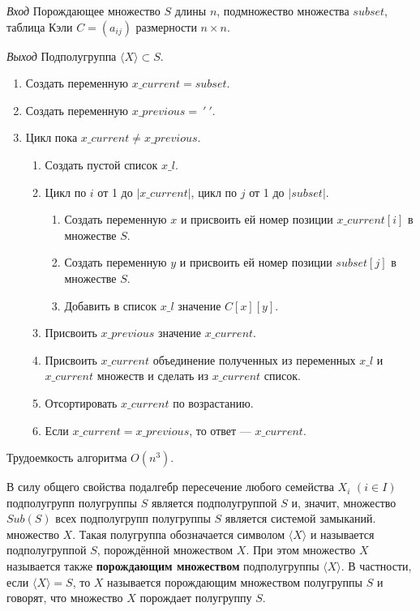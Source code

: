 \documentclass[bachelor, och, labwork]{shiza}
\begin{document}
\textit{Вход} Порождающее множество $S$ длины $n$, подмножество множества $subset$,
таблица Кэли $C = (a_{ij})$ размерности $n \times n$.

\textit{Выход} Подполугруппа $\langle X \rangle \subset S$.

\begin{enumerate}
    \item Создать переменную $x\_current=subset$.
    \item Создать переменную $x\_previous=~'~'$.
    \item Цикл пока $x\_current \not = x\_previous$.
        \begin{enumerate}
            \item Создать пустой список $x\_l$.
            \item Цикл по $i$ от 1 до $|x\_current|$, цикл по $j$ от 1 до $|subset|$.
                \begin{enumerate}
                    \item Создать переменную $x$ и присвоить ей номер позиции
                    $x\_current[i]$ в множестве $S$.
                    \item Создать переменную $y$ и присвоить ей номер позиции
                    $subset[j]$ в множестве $S$.
                    \item Добавить в список $x\_l$ значение $C[x][y]$.
                \end{enumerate}
            \item Присвоить $x\_previous$ значение $x\_current$.
            \item Присвоить $x\_current$ объединение полученных из переменных $x\_l$ 
            и $x\_current$ множеств и сделать из $x\_current$ список.
            \item Отсортировать $x\_current$ по возрастанию.
            \item Если $x\_current = x\_previous$, то ответ --- $x\_current$.
        \end{enumerate}
\end{enumerate}

Трудоемкость алгоритма $O(n^3)$.

В силу общего свойства подалгебр пересечение любого семейства $X_i$ $(i \in I)$ 
подполугрупп полугруппы $S$ является подполугруппой $S$ и, значит, множество $Sub(S)$ 
всех подполугрупп полугруппы $S$ является системой замыканий. множество $X$. Такая 
полугруппа обозначается символом $\langle X \rangle$ и называется подполугруппой 
$S$, порождённой множеством $X$. При этом множество $X$ называется также 
\textbf{порождающим множеством} подполугруппы $\langle X \rangle$. В частности, 
если $\langle X \rangle = S$, то $X$ называется порождающим множеством полугруппы 
$S$ и говорят, что множество $X$ порождает полугруппу $S$.
\end{document}
